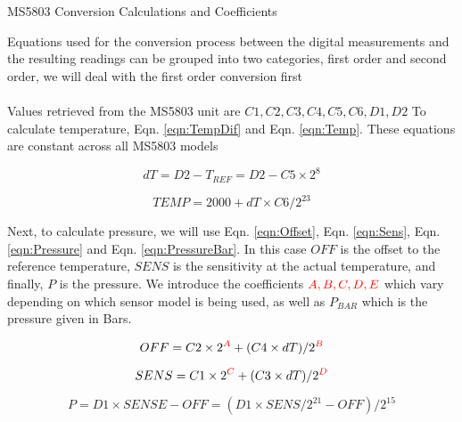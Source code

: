 \documentclass[10pt,a4paper]{report}
\begin{document}


\begin{center}
\Large
MS5803 Conversion Calculations and Coefficients
\end{center}

\normalsize

Equations used for the conversion process between the digital measurements and the resulting readings can be grouped into two categories, first order and second order, we will deal with the first order conversion first
\\
\\
Values retrieved from the MS5803 unit are $C1, C2, C3, C4, C5, C6, D1,D2$
To calculate temperature, Eqn. \ref{eqn:TempDif} and Eqn. \ref{eqn:Temp}. These equations are constant across all MS5803 models

\begin{equation}
dT = D2 - T_{REF} = D2 - C5 \times 2^8
\label{eqn:TempDif}
\end{equation}

\begin{equation}
TEMP = 2000 + dT \times C6 / 2^{23}
\label{eqn:Temp}
\end{equation}

Next, to calculate pressure, we will use Eqn. \ref{eqn:Offset}, Eqn. \ref{eqn:Sens}, Eqn. \ref{eqn:Pressure} and Eqn. \ref{eqn:PressureBar}. In this case $OFF$ is the offset to the reference temperature, $SENS$ is the sensitivity at the actual temperature, and finally, $P$ is the pressure. We introduce the coefficients $\mathbin{\color{red}A, B, C, D, E}$ which vary depending on which sensor model is being used, as well as $P_{BAR}$ which is the pressure given in Bars.

\begin{equation}
OFF = C2 \times 2^{\mathbin{\color{red}A}} + (C4 \times dT)/2^{\mathbin{\color{red}B}}
\label{eqn:Offset}
\end{equation}

\begin{equation}
SENS = C1 \times 2^{\mathbin{\color{red}C}} + (C3\times dT) / 2^{\mathbin{\color{red}D}}
\label{eqn:Sens}
\end{equation}

\begin{equation}
P = D1 \times SENSE - OFF = (D1 \times SENS/2^{21} - OFF)/2^{15}
\label{eqn:Pressure}
\end{equation}
\end{document}
